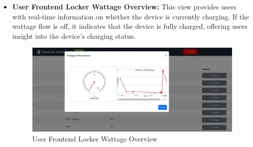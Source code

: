 \begin{itemize}
\item \textbf{User Frontend Locker Wattage Overview: }This view provides users with real-time information on whether the device is currently charging. If the wattage flow is off, it indicates that the device is fully charged, offering users insight into the device's charging status.
\begin{figure}[h]
    \centering
    \includegraphics[width=1\linewidth]{images/user_wattage.JPG}
    \caption{User Frontend Locker Wattage Overview}
    \label{fig:locker-wattage-overview}
\end{figure}
\end{itemize}


